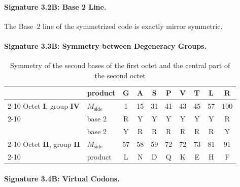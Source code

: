 \documentclass[12pt]{article}
\begin{document}
\paragraph{Signature 3.2B: Base 2 Line.} The Base~2 line of the symmetrized code is exactly mirror symmetric.

\paragraph{Signature 3.3B: Symmetry between Degeneracy Groups.}

\begin{table}[htbp]
\centering
\caption{Symmetry of the second bases of the first octet and the central part of the second octet}
\label{tab:degeneracy_symm}
\begin{tabular}{|l|l|c|c|c|c|c|c|c|c|}
\hline
 & product & G & A & S & P & V & T & L & R \\
\cline{2-10}
Octet \textbf{I}, group \textbf{IV} & $M_{\text{side}}$ & 1 & 15 & 31 & 41 & 43 & 45 & 57 & 100 \\
\cline{2-10}
 & base 2 & R & Y & Y & Y & Y & Y & Y & R \\
\hline
\hline
 & base 2 & Y & R & R & R & R & R & R & Y \\
\cline{2-10}
Octet \textbf{II}, group \textbf{II} & $M_{\text{side}}$ & 57 & 58 & 59 & 72 & 72 & 73 & 81 & 91 \\
\cline{2-10}
 & product & L & N & D & Q & K & E & H & F \\
\hline
\end{tabular}
\end{table}

\paragraph{Signature 3.4B: Virtual Codons.}
\end{document}
